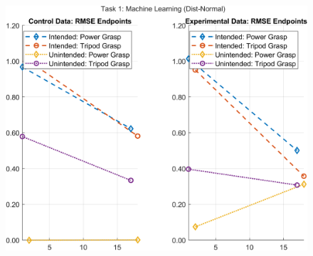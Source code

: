 \documentclass[12pt]{article}
\newcommand\figWidth{7in}
\begin{document}
\begin{figure}
    \includegraphics[width = \figWidth]{t1-spaghetti-dnorm.png}
\end{figure}
\end{document}
